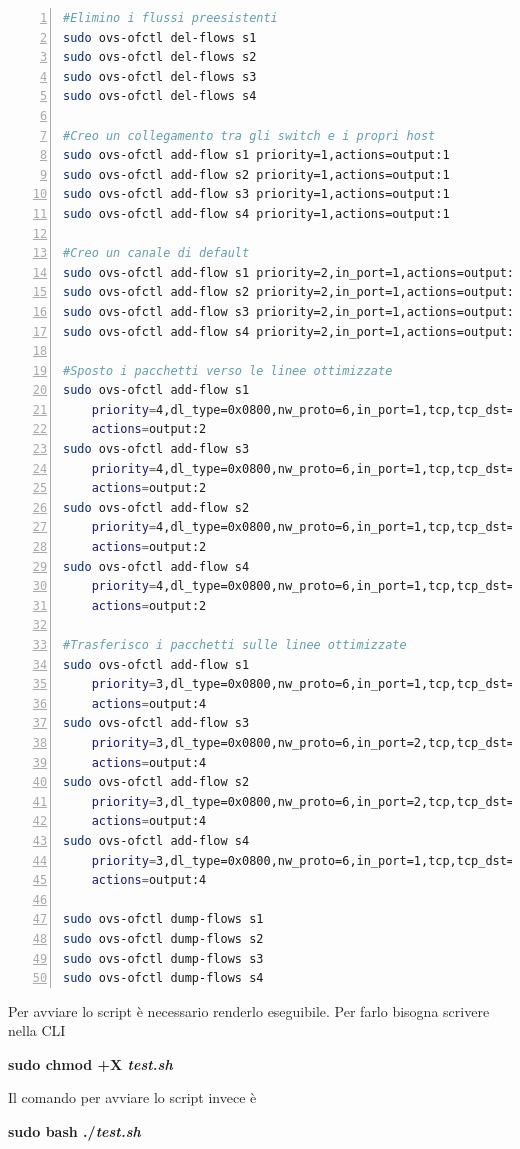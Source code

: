 \begin{lstlisting}[language=bash,numbers=left,firstnumber=1,stepnumber=1]
#Elimino i flussi preesistenti
sudo ovs-ofctl del-flows s1
sudo ovs-ofctl del-flows s2
sudo ovs-ofctl del-flows s3
sudo ovs-ofctl del-flows s4

#Creo un collegamento tra gli switch e i propri host
sudo ovs-ofctl add-flow s1 priority=1,actions=output:1
sudo ovs-ofctl add-flow s2 priority=1,actions=output:1
sudo ovs-ofctl add-flow s3 priority=1,actions=output:1
sudo ovs-ofctl add-flow s4 priority=1,actions=output:1

#Creo un canale di default
sudo ovs-ofctl add-flow s1 priority=2,in_port=1,actions=output:3
sudo ovs-ofctl add-flow s2 priority=2,in_port=1,actions=output:3
sudo ovs-ofctl add-flow s3 priority=2,in_port=1,actions=output:3
sudo ovs-ofctl add-flow s4 priority=2,in_port=1,actions=output:3

#Sposto i pacchetti verso le linee ottimizzate
sudo ovs-ofctl add-flow s1 
	priority=4,dl_type=0x0800,nw_proto=6,in_port=1,tcp,tcp_dst=20,
	actions=output:2
sudo ovs-ofctl add-flow s3 
	priority=4,dl_type=0x0800,nw_proto=6,in_port=1,tcp,tcp_dst=20,
	actions=output:2
sudo ovs-ofctl add-flow s2 
	priority=4,dl_type=0x0800,nw_proto=6,in_port=1,tcp,tcp_dst=5000,
	actions=output:2
sudo ovs-ofctl add-flow s4 	
	priority=4,dl_type=0x0800,nw_proto=6,in_port=1,tcp,tcp_dst=5000,
	actions=output:2

#Trasferisco i pacchetti sulle linee ottimizzate
sudo ovs-ofctl add-flow s1 
	priority=3,dl_type=0x0800,nw_proto=6,in_port=1,tcp,tcp_dst=5000,
	actions=output:4
sudo ovs-ofctl add-flow s3 
	priority=3,dl_type=0x0800,nw_proto=6,in_port=2,tcp,tcp_dst=5000,
	actions=output:4
sudo ovs-ofctl add-flow s2 
	priority=3,dl_type=0x0800,nw_proto=6,in_port=2,tcp,tcp_dst=20,
	actions=output:4
sudo ovs-ofctl add-flow s4 
	priority=3,dl_type=0x0800,nw_proto=6,in_port=1,tcp,tcp_dst=20,
	actions=output:4

sudo ovs-ofctl dump-flows s1
sudo ovs-ofctl dump-flows s2
sudo ovs-ofctl dump-flows s3
sudo ovs-ofctl dump-flows s4
\end{lstlisting}
Per avviare lo script è necessario renderlo eseguibile. Per farlo bisogna scrivere nella CLI
\begin{center}
	\textbf{sudo chmod +X \textit{test.sh}}
\end{center}
Il comando per avviare lo script invece è
\begin{center}
	\textbf{sudo bash ./\textit{test.sh}}
\end{center}
